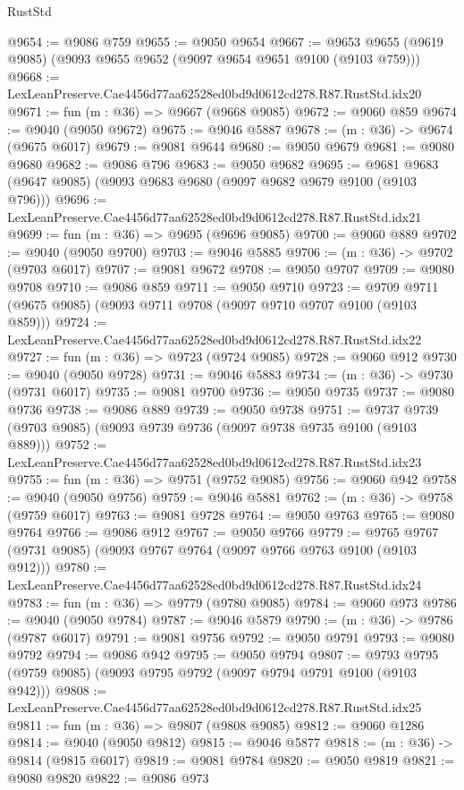 \begin{lexlean}{RustStd}
\begin{coremodule}
{{@9654 := @9086 @759
@9655 := @9050 @9654
@9667 := @9653 @9655 (@9619 @9085) (@9093 @9655 @9652 (@9097 @9654 @9651 @9100 (@9103 @759)))
@9668 := LexLeanPreserve.Cae4456d77aa62528ed0bd9d0612cd278.R87.RustStd.idx20
@9671 := fun (m : @36) => @9667 (@9668 @9085)
@9672 := @9060 @859
@9674 := @9040 (@9050 @9672)
@9675 := @9046 @5887
@9678 := (m : @36) -> @9674 (@9675 @6017)
@9679 := @9081 @9644
@9680 := @9050 @9679
@9681 := @9080 @9680
@9682 := @9086 @796
@9683 := @9050 @9682
@9695 := @9681 @9683 (@9647 @9085) (@9093 @9683 @9680 (@9097 @9682 @9679 @9100 (@9103 @796)))
@9696 := LexLeanPreserve.Cae4456d77aa62528ed0bd9d0612cd278.R87.RustStd.idx21
@9699 := fun (m : @36) => @9695 (@9696 @9085)
@9700 := @9060 @889
@9702 := @9040 (@9050 @9700)
@9703 := @9046 @5885
@9706 := (m : @36) -> @9702 (@9703 @6017)
@9707 := @9081 @9672
@9708 := @9050 @9707
@9709 := @9080 @9708
@9710 := @9086 @859
@9711 := @9050 @9710
@9723 := @9709 @9711 (@9675 @9085) (@9093 @9711 @9708 (@9097 @9710 @9707 @9100 (@9103 @859)))
@9724 := LexLeanPreserve.Cae4456d77aa62528ed0bd9d0612cd278.R87.RustStd.idx22
@9727 := fun (m : @36) => @9723 (@9724 @9085)
@9728 := @9060 @912
@9730 := @9040 (@9050 @9728)
@9731 := @9046 @5883
@9734 := (m : @36) -> @9730 (@9731 @6017)
@9735 := @9081 @9700
@9736 := @9050 @9735
@9737 := @9080 @9736
@9738 := @9086 @889
@9739 := @9050 @9738
@9751 := @9737 @9739 (@9703 @9085) (@9093 @9739 @9736 (@9097 @9738 @9735 @9100 (@9103 @889)))
@9752 := LexLeanPreserve.Cae4456d77aa62528ed0bd9d0612cd278.R87.RustStd.idx23
@9755 := fun (m : @36) => @9751 (@9752 @9085)
@9756 := @9060 @942
@9758 := @9040 (@9050 @9756)
@9759 := @9046 @5881
@9762 := (m : @36) -> @9758 (@9759 @6017)
@9763 := @9081 @9728
@9764 := @9050 @9763
@9765 := @9080 @9764
@9766 := @9086 @912
@9767 := @9050 @9766
@9779 := @9765 @9767 (@9731 @9085) (@9093 @9767 @9764 (@9097 @9766 @9763 @9100 (@9103 @912)))
@9780 := LexLeanPreserve.Cae4456d77aa62528ed0bd9d0612cd278.R87.RustStd.idx24
@9783 := fun (m : @36) => @9779 (@9780 @9085)
@9784 := @9060 @973
@9786 := @9040 (@9050 @9784)
@9787 := @9046 @5879
@9790 := (m : @36) -> @9786 (@9787 @6017)
@9791 := @9081 @9756
@9792 := @9050 @9791
@9793 := @9080 @9792
@9794 := @9086 @942
@9795 := @9050 @9794
@9807 := @9793 @9795 (@9759 @9085) (@9093 @9795 @9792 (@9097 @9794 @9791 @9100 (@9103 @942)))
@9808 := LexLeanPreserve.Cae4456d77aa62528ed0bd9d0612cd278.R87.RustStd.idx25
@9811 := fun (m : @36) => @9807 (@9808 @9085)
@9812 := @9060 @1286
@9814 := @9040 (@9050 @9812)
@9815 := @9046 @5877
@9818 := (m : @36) -> @9814 (@9815 @6017)
@9819 := @9081 @9784
@9820 := @9050 @9819
@9821 := @9080 @9820
@9822 := @9086 @973
}}
\end{coremodule}
\end{lexlean}
